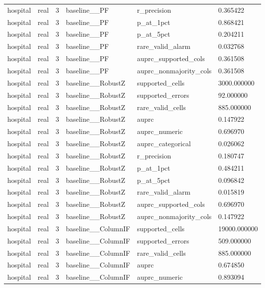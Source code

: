 \begin{tabular}{llllll}
hospital & real & 3 & baseline\_\_PF & r\_precision & 0.365422 \\
hospital & real & 3 & baseline\_\_PF & p\_at\_1pct & 0.868421 \\
hospital & real & 3 & baseline\_\_PF & p\_at\_5pct & 0.204211 \\
hospital & real & 3 & baseline\_\_PF & rare\_valid\_alarm & 0.032768 \\
hospital & real & 3 & baseline\_\_PF & auprc\_supported\_cols & 0.361508 \\
hospital & real & 3 & baseline\_\_PF & auprc\_nonmajority\_cols & 0.361508 \\
hospital & real & 3 & baseline\_\_RobustZ & supported\_cells & 3000.000000 \\
hospital & real & 3 & baseline\_\_RobustZ & supported\_errors & 92.000000 \\
hospital & real & 3 & baseline\_\_RobustZ & rare\_valid\_cells & 885.000000 \\
hospital & real & 3 & baseline\_\_RobustZ & auprc & 0.147922 \\
hospital & real & 3 & baseline\_\_RobustZ & auprc\_numeric & 0.696970 \\
hospital & real & 3 & baseline\_\_RobustZ & auprc\_categorical & 0.026062 \\
hospital & real & 3 & baseline\_\_RobustZ & r\_precision & 0.180747 \\
hospital & real & 3 & baseline\_\_RobustZ & p\_at\_1pct & 0.484211 \\
hospital & real & 3 & baseline\_\_RobustZ & p\_at\_5pct & 0.096842 \\
hospital & real & 3 & baseline\_\_RobustZ & rare\_valid\_alarm & 0.015819 \\
hospital & real & 3 & baseline\_\_RobustZ & auprc\_supported\_cols & 0.696970 \\
hospital & real & 3 & baseline\_\_RobustZ & auprc\_nonmajority\_cols & 0.147922 \\
hospital & real & 3 & baseline\_\_ColumnIF & supported\_cells & 19000.000000 \\
hospital & real & 3 & baseline\_\_ColumnIF & supported\_errors & 509.000000 \\
hospital & real & 3 & baseline\_\_ColumnIF & rare\_valid\_cells & 885.000000 \\
hospital & real & 3 & baseline\_\_ColumnIF & auprc & 0.674850 \\
hospital & real & 3 & baseline\_\_ColumnIF & auprc\_numeric & 0.893094 \\

\end{tabular}
